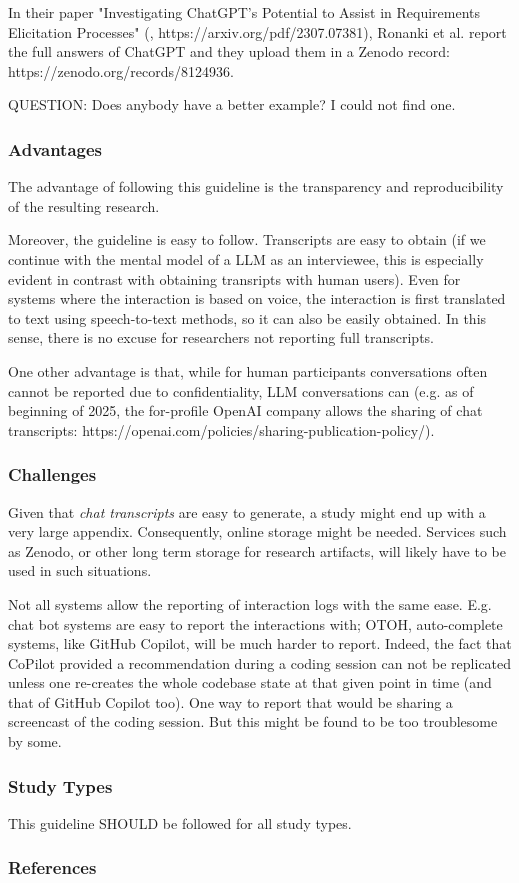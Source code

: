 \documentclass[11pt]{article}
\begin{document}
In their paper "Investigating ChatGPT's Potential to Assist in Requirements Elicitation Processes" (\cite{ronanki2023investigating}, https://arxiv.org/pdf/2307.07381), Ronanki et al. report the full answers of ChatGPT and they upload them in a Zenodo record: https://zenodo.org/records/8124936. 

QUESTION: Does anybody have a better example? I could not find one. 


\subsubsection{Advantages}

The advantage of following this guideline is the transparency and reproducibility of the resulting research. 

Moreover, the guideline is easy to follow. Transcripts are easy to obtain (if we continue with the mental model of a LLM as an interviewee, this is especially evident in contrast with obtaining transripts with human users). Even for systems where the interaction is based on voice, the interaction is first translated to text using speech-to-text methods, so it can also be easily obtained. In this sense, there is no excuse for researchers not reporting full transcripts. 

One other advantage is that, while for human participants conversations often cannot be reported due to confidentiality, LLM conversations can (e.g. as of beginning of 2025, the for-profile OpenAI company allows the sharing of chat transcripts: https://openai.com/policies/sharing-publication-policy/). 


\subsubsection{Challenges}

Given that {\em chat transcripts} are easy to generate, a study might end up with a very large appendix. Consequently, online storage might be needed. Services such as Zenodo, or other long term storage for research artifacts, will likely have to be used in such situations.

Not all systems allow the reporting of interaction logs with the same ease. E.g. chat bot systems are easy to report the interactions with; OTOH, auto-complete systems, like GitHub Copilot, will be much harder to report. Indeed, the fact that CoPilot provided a recommendation during a coding session can not be replicated unless one re-creates the whole codebase state at that given point in time (and that of GitHub Copilot too). One way to report that would be sharing a screencast of the coding session. But this might be found to be too troublesome by some. 


\subsubsection{Study Types}

This guideline SHOULD be followed for all study types. 


\subsubsection{References}



\end{document}
